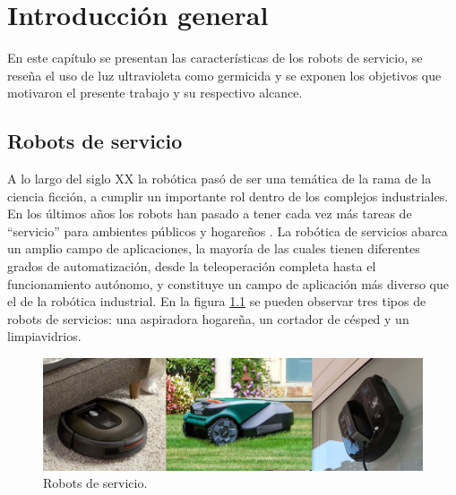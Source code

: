 
\chapter{Introducción general} %

\label{Chapter1} %
\label{IntroGeneral}
En este capítulo se presentan las características de los robots de servicio, se  reseña el uso de luz ultravioleta como germicida y se exponen los objetivos que motivaron el presente trabajo y su respectivo alcance.

\newcommand{\keyword}[1]{\textbf{#1}}
\newcommand{\tabhead}[1]{\textbf{#1}}
\newcommand{\code}[1]{\texttt{#1}}
\newcommand{\file}[1]{\texttt{\bfseries#1}}
\newcommand{\option}[1]{\texttt{\itshape#1}}
\newcommand{\grados}{$^{\circ}$}



\section{Robots de servicio}

A lo largo del siglo XX la robótica pasó de ser una temática de la rama de la ciencia ficción, a cumplir un importante rol dentro de los complejos industriales. En los últimos años los robots han pasado a tener cada vez más tareas de “servicio” para ambientes  públicos y hogareños \citep{services}.
La robótica de servicios abarca un amplio campo de aplicaciones, la mayoría de las cuales tienen diferentes grados de automatización, desde la teleoperación completa hasta el funcionamiento autónomo, y constituye un campo de aplicación más diverso que el de la robótica industrial. En la  figura \ref{fig:robotsservicio} se pueden observar tres tipos de robots de servicios: una aspiradora hogareña, un cortador de césped y un limpiavidrios.

\begin{figure}[h]
	\centering
	\includegraphics[width=\textwidth]{./Figures/robotsservicio.jpg}
	\caption{Robots de servicio\protect\footnotemark.}
	\label{fig:robotsservicio}
\end{figure}


